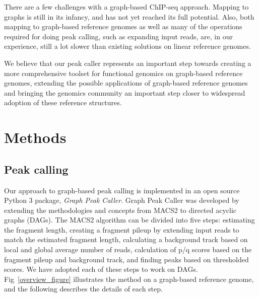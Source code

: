 \documentclass[10pt,letterpaper]{article}
\begin{document}
There are a few challenges with a graph-based ChIP-seq approach. Mapping to graphs is still in its infancy, and has not yet reached its full potential. Also, both mapping to graph-based reference genomes as well as many of the operations required for doing peak calling, such as expanding input reads, are, in our experience, still a lot slower than existing solutions on linear reference genomes. 

We believe that our peak caller represents an important step towards creating a more comprehensive toolset for functional genomics on graph-based reference genomes, extending the possible applications of graph-based reference genomes and bringing the genomics community an important step closer to widespread adoption of these reference structures.

\section*{Methods}
\subsection*{Peak calling}
Our approach to graph-based peak calling is implemented in an open source Python 3 package, \emph{Graph Peak Caller}. Graph Peak Caller was developed by extending the methodologies and concepts from MACS2 to directed acyclic graphs (DAGs). The MACS2 algorithm can be divided into five steps: estimating the fragment length, creating a fragment pileup by extending input reads to match the estimated fragment length, calculating a background track based on local and global average number of reads, calculation of p/q scores based on the fragment pileup and background track, and finding peaks based on thresholded scores. We have adopted each of these steps to work on DAGs. Fig~\ref{overview_figure} illustrates the method on a graph-based reference genome, and the following describes the details of each step.
\end{document}
